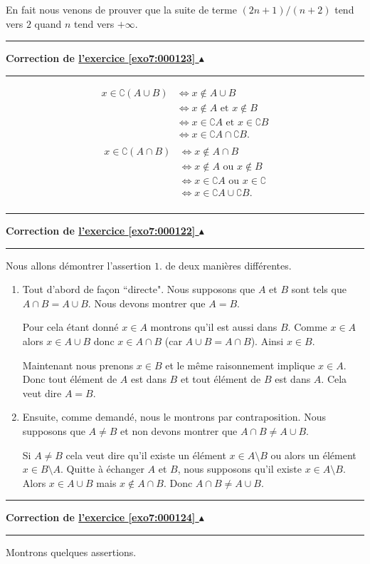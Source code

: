 \documentclass[11pt,a4paper]{article}
\newcounter{exo}
\newcommand{\correction}[1]{\hypertarget{cor7:#1}{}\label{cor7:#1}{\bf Correction de \hyperlink{exo7:#1}{l'exercice \ref{exo7:#1} $\blacktriangle$}}\vspace{1mm}\hrule\vspace{1mm}}
\newcommand{\fincorrection}{\vspace{1mm}\hrule\vspace*{7mm}}
\begin{document}
En fait nous venons de prouver que la suite 
de terme $(2n+1)/(n+2)$ tend vers $2$ quand $n$ tend vers $+\infty$.
\fincorrection
\correction{000123}
\begin{align*}
x\in\complement (A\cup B) & \Leftrightarrow x\notin A\cup B \\
&\Leftrightarrow x\notin A \text{ et } x\notin B\\
&\Leftrightarrow x\in\complement A \text{ et } x\in\complement B\\
&\Leftrightarrow x\in \complement A \cap \complement B.\\
\end{align*}
\begin{align*}
x\in\complement (A\cap B) & \Leftrightarrow x\notin A\cap B\\
&\Leftrightarrow x\notin A \text{ ou } x\notin B\\
&\Leftrightarrow x\in\complement A \text{ ou } x\in\complement\\
&\Leftrightarrow x\in \complement A \cup \complement B.\\
\end{align*}
\fincorrection
\correction{000122}
Nous allons d\'emontrer l'assertion $1.$ de deux mani\`eres diff\'erentes.
\begin{enumerate}
  \item Tout d'abord de fa\c{c}on ``directe". Nous supposons
que $A$ et $B$ sont tels que $A\cap B = A \cup B$. Nous devons montrer 
que $A=B$. 

Pour cela \'etant donn\'e $x \in A$ montrons qu'il est aussi dans $B$.
Comme $x\in A$ alors $x \in A\cup B$ donc $x \in A \cap  B$ (car $A\cup B= A \cap B$). Ainsi $x \in B$. 

Maintenant nous prenons $x\in B$ et le m\^eme raisonnement implique $x \in A$.
Donc tout \'el\'ement de $A$ est dans $B$ et tout \'el\'ement de $B$ est dans $A$.
Cela veut dire $A=B$.

  \item Ensuite, comme demand\'e, nous le montrons par contraposition.
Nous supposons que $A\not= B$ et non devons montrer que 
$A\cap B \not= A\cup B$.

Si $A\not= B$ cela veut dire qu'il existe un \'el\'ement $x \in A\setminus B$
ou alors un \'el\'ement $x\in B \setminus A$. Quitte \`a \'echanger $A$ et $B$, nous supposons qu'il existe $x\in A \setminus B$. Alors $x \in A \cup B$ mais
$x \notin A\cap B$. Donc $A\cap B \not= A\cup B$.
\end{enumerate}
\fincorrection
\correction{000124}
Montrons quelques assertions.
\end{document}
